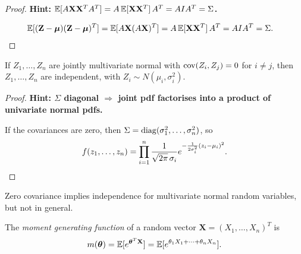 \documentclass[a4paper]{article}
\begin{document}
\begin{proof}
  \textbf{Hint: $\mathbb{E}[A\mathbf{X}\mathbf{X}^T A^T] = A\,\mathbb{E}[\mathbf{X}\mathbf{X}^T]\,A^T = AI A^T = \Sigma$.}

  \begin{align*}
    \mathbb{E}[(\mathbf{Z} - \boldsymbol\mu)(\mathbf{Z} - \boldsymbol\mu)^T] &= \mathbb{E}[A\mathbf{X}(A\mathbf{X})^T]
    = A\,\mathbb{E}[\mathbf{X}\mathbf{X}^T]\,A^T
    = AIA^T
    = \Sigma.\qedhere
  \end{align*}
\end{proof}

\begin{prop}
  If $Z_1, \dotsc, Z_n$ are jointly multivariate normal with $\operatorname{cov}(Z_i, Z_j) = 0$ for $i \neq j$, then $Z_1, \dotsc, Z_n$ are independent, with $Z_i \sim N(\mu_i, \sigma_i^2)$.
\end{prop}

\begin{proof}
  \textbf{Hint: $\Sigma$ diagonal $\Rightarrow$ joint pdf factorises into a product of univariate normal pdfs.}

  If the covariances are zero, then $\Sigma = \operatorname{diag}(\sigma_1^2, \dotsc, \sigma_n^2)$, so
  \[
    f(z_1, \dotsc, z_n) = \prod_{i=1}^n \frac{1}{\sqrt{2\pi}\,\sigma_i} e^{-\frac{1}{2\sigma_i^2}(z_i - \mu_i)^2}.\qedhere
  \]
\end{proof}

\begin{remark}
  Zero covariance implies independence for multivariate normal random variables, but not in general.
\end{remark}

\begin{defi}
  The \emph{moment generating function} of a random vector $\mathbf{X} = (X_1, \dotsc, X_n)^T$ is
  \[
    m(\boldsymbol\theta) = \mathbb{E}[e^{\boldsymbol\theta^T \mathbf{X}}] = \mathbb{E}[e^{\theta_1 X_1 + \dotsb + \theta_n X_n}].
  \]
\end{defi}
\end{document}
